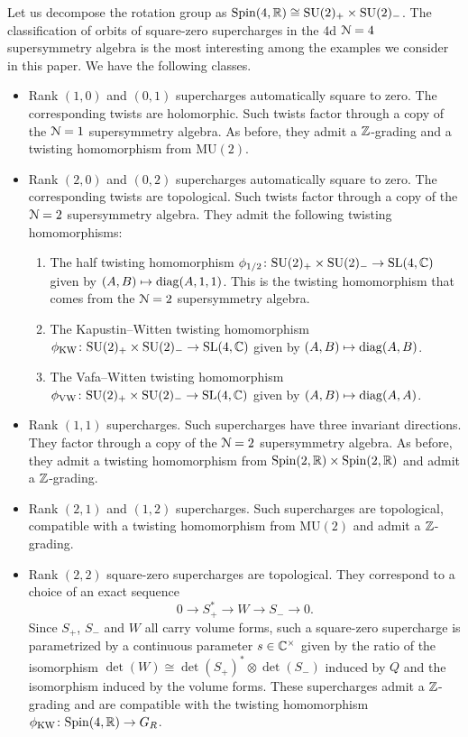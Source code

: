\documentclass[10pt, oneside]{article}
\newcommand{\MU}{\mathrm{MU}}
\begin{document}
Let us decompose the rotation group as $\mathrm{Spin}(4, \mathbb R)\cong \mathrm{SU}(2)_+\times \mathrm{SU}(2)_-$. The classification of orbits of square-zero supercharges in the 4d $\mathcal{N}=4$ supersymmetry algebra is the most interesting among the examples we consider in this paper. We have the following classes. 
\begin{itemize}
\item Rank $(1,0)$ and $(0,1)$ supercharges automatically square to zero. The corresponding twists are holomorphic. Such twists factor through a copy of the $\mathcal N = 1$ supersymmetry algebra. As before, they admit a $\mathbb Z$-grading and a twisting homomorphism from $\MU(2)$.

\item Rank $(2, 0)$ and $(0, 2)$ supercharges automatically square to zero. The corresponding twists are topological. Such twists factor through a copy of the $\mathcal N = 2$ supersymmetry algebra. They admit the following twisting homomorphisms:
 \begin{enumerate}
  \item The half twisting homomorphism $\phi_{\mathrm{1/2}} \colon \mathrm{SU}(2)_+ \times \mathrm{SU}(2)_- \to \mathrm{SL}(4,\mathbb C)$ given by $(A,B) \mapsto \mathrm{diag}(A, 1, 1)$. This is the twisting homomorphism that comes from the $\mathcal N=2$ supersymmetry algebra.
  \item The Kapustin--Witten twisting homomorphism $\phi_{\mathrm{KW}} \colon \mathrm{SU}(2)_+ \times \mathrm{SU}(2)_- \to \mathrm{SL}(4,\mathbb C)$ given by $(A,B) \mapsto \mathrm{diag}(A, B)$.
  \item The Vafa--Witten twisting homomorphism $\phi_{\mathrm{VW}} \colon \mathrm{SU}(2)_+ \times \mathrm{SU}(2)_- \to \mathrm{SL}(4, \mathbb C)$ given by $(A,B) \mapsto \mathrm{diag}(A, A)$.
 \end{enumerate}
 
 \item Rank $(1,1)$ supercharges.  Such supercharges have three invariant directions. They factor through a copy of the $\mathcal N=2$ supersymmetry algebra. As before, they admit a twisting homomorphism from $\mathrm{Spin}(2, \mathbb R)\times \mathrm{Spin}(2, \mathbb R)$ and admit a $\mathbb Z$-grading.

 \item Rank $(2,1)$ and $(1,2)$ supercharges.  Such supercharges are topological, compatible with a twisting homomorphism from $\MU(2)$ and admit a $\mathbb Z$-grading.
 
 \item Rank $(2,2)$ square-zero supercharges are topological. They correspond to a choice of an exact sequence
 \[0\rightarrow S_+^*\rightarrow W\rightarrow S_-\rightarrow 0.\]
 Since $S_+$, $S_-$ and $W$ all carry volume forms, such a square-zero supercharge is parametrized by a continuous parameter $s\in\mathbb C^\times$ given by the ratio of the isomorphism $\det(W)\cong \det(S_+)^*\otimes \det(S_-)$ induced by $Q$ and the isomorphism induced by the volume forms. These supercharges admit a $\mathbb Z$-grading and are compatible with the twisting homomorphism $\phi_{\mathrm{KW}}\colon \mathrm{Spin}(4, \mathbb R)\rightarrow G_R$.
\end{itemize}
\end{document}
